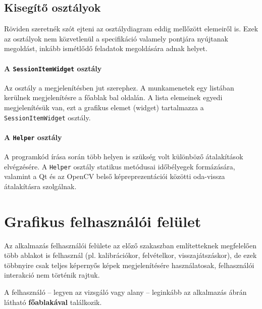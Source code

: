 \subsection{Kisegítő osztályok}\label{sect:helper}

Röviden szeretnék szót ejteni az osztálydiagram eddig mellőzött elemeiről is. Ezek az osztályok nem közvetlenül a specifikáció valamely pontjára nyújtanak megoldást, inkább ismétlődő feladatok megoldására adnak helyet.

\paragraph{A \texttt{SessionItemWidget} osztály}

Az osztály a megjelenítésben jut szerephez. A munkamenetek egy listában kerülnek megjelenítésre a főablak bal oldalán. A lista elemeinek egyedi megjelenítésük van, ezt a grafikus elemet (widget) tartalmazza a \texttt{SessionItemWidget} osztály.

\paragraph{A \texttt{Helper} osztály}

A programkód írása során több helyen is szükség volt különböző átalakítások elvégzésére. A \texttt{Helper} osztály statikus metódusai időbélyegek formázására, valamint a Qt és az OpenCV belső képreprezentációi közötti oda-vissza átalakításra szolgálnak.

\section{Grafikus felhasználói felület}\label{sect:gui}

Az alkalmazás felhasználói felülete az előző szakaszban említetteknek megfelelően több ablakot is felhasznál (pl. kalibrációkor, felvételkor, visszajátszáskor), de ezek többnyire csak teljes képernyős képek megjelenítésére használatosak, felhasználói interakció nem történik rajtuk.

A felhasználó -- legyen az vizsgáló vagy alany -- leginkább az alkalmazás  ábrán látható \textbf{főablakával} találkozik.

